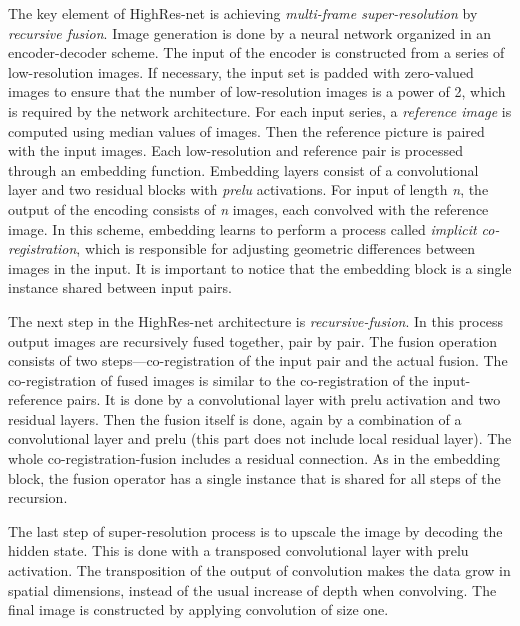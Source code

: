The key element of HighRes-net is achieving \textit{multi-frame super-resolution} by \textit{recursive fusion}.
Image generation is done by a neural network organized in an encoder-decoder scheme.
The input of the encoder is constructed from a series of low-resolution images.
If necessary, the input set is padded with zero-valued images to ensure that the number of low-resolution images is a power of 2, which is required by the network architecture.
For each input series, a \textit{reference image} is computed using median values of images.
Then the reference picture is paired with the input images.
Each low-resolution and reference pair is processed through an embedding function.
Embedding layers consist of a convolutional layer and two residual blocks with \textit{\gls{prelu}} activations.
For input of length \textit{n}, the output of the encoding consists of \textit{n} images, each convolved with the reference image.
In this scheme, embedding learns to perform a process called \textit{implicit co-registration}, which is responsible for adjusting geometric differences between images in the input.
It is important to notice that the embedding block is a single instance shared between input pairs.

The next step in the HighRes-net architecture is \textit{recursive-fusion}.
In this process output images are recursively fused together, pair by pair.
The fusion operation consists of two steps---co-registration of the input pair and the actual fusion.
The co-registration of fused images is similar to the co-registration of the input-reference pairs.
It is done by a convolutional layer with \gls{prelu} activation and two residual layers.
Then the fusion itself is done, again by a combination of a convolutional layer and \gls{prelu} (this part does not include local residual layer).
The whole co-registration-fusion includes a residual connection.
As in the embedding block, the fusion operator has a single instance that is shared for all steps of the recursion.

The last step of super-resolution process is to upscale the image by decoding the hidden state.
This is done with a transposed convolutional layer with \gls{prelu} activation.
The transposition of the output of convolution makes the data grow in spatial dimensions, instead of the usual increase of depth when convolving.
The final image is constructed by applying convolution of size one.

